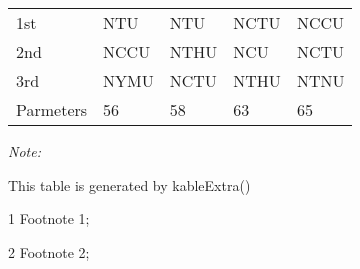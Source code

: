 \begin{table}
\begin{threeparttable}
\begin{tabular}[t]{lllll}
\hspace{1em}1st & NTU & NTU & NCTU & NCCU\\
\hspace{1em}2nd & NCCU & NTHU & NCU & NCTU\\
\hspace{1em}3rd & NYMU & NCTU & NTHU & NTNU\\
Parmeters & 56 & 58 & 63 & 65\\
\bottomrule
\end{tabular}
\begin{tablenotes}
\item \textit{Note: } 
\item This table is generated by kableExtra()
\item[1] Footnote 1; 
\item[2] Footnote 2; 
\end{tablenotes}
\end{threeparttable}
\end{table}
